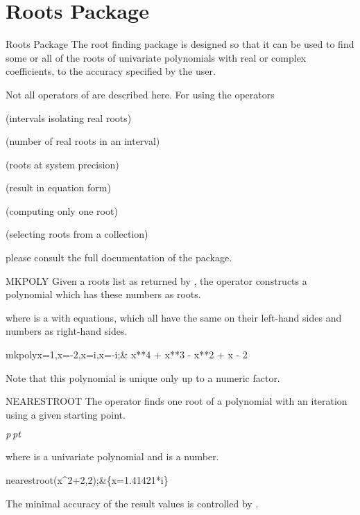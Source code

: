 \newpage
\section{Roots Package}
\begin{Introduction}{Roots Package}
The root  finding package is designed  so that it can  
be  used to  find some  or  all of  the roots  of  univariate
polynomials  with  real or  complex  coefficients,  to  the  accuracy
specified by the user.                             

Not all operators of  are described here. For using
the operators 

 (intervals isolating real roots)

 (number of real roots in an interval)

 (roots at system precision)

 (result in equation form)

 (computing only one root)

 (selecting roots from a collection)

please consult the full documentation of the package.

\end{Introduction}

\begin{Operator}{MKPOLY}
Given a roots list as returned by ,
the operator  constructs a 
polynomial which has these numbers as roots.
\begin{Syntax}
 
\end{Syntax}
where  is a  with equations, which
all have the same  on their left-hand sides
and numbers as right-hand sides.

\begin{Examples}
mkpoly{x=1,x=-2,x=i,x=-i};&
x**4 + x**3 - x**2 + x - 2\\
\end{Examples}

Note that this polynomial is unique only up to a numeric
factor.
\end{Operator}


\begin{Operator}{NEARESTROOT}
The operator  finds one root of a polynomial
with an iteration using a given starting point.

\begin{Syntax}
\(\meta{p}\,\meta{pt}\)
\end{Syntax}

where  is a univariate polynomial
and  is a number. 

\begin{Examples}
nearestroot(x^2+2,2);&\{x=1.41421*i\}\\
\end{Examples}
The minimal accuracy of the result values is controlled by 
.
\end{Operator}

